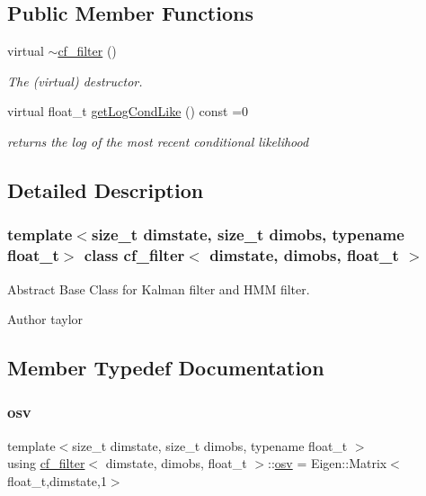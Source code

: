 \subsection*{Public Member Functions}
\begin{DoxyCompactItemize}
\item 
\mbox{\label{classcf__filter_afd3e7b3c1c0cc86257b406d494b0a7c9}} 
virtual \hyperlink{classcf__filter_afd3e7b3c1c0cc86257b406d494b0a7c9}{$\sim$cf\+\_\+filter} ()
\begin{DoxyCompactList}\small\item\em The (virtual) destructor. \end{DoxyCompactList}\item 
virtual float\+\_\+t \hyperlink{classcf__filter_a11b26307172bf94b8075ed2cdb8fc09c}{get\+Log\+Cond\+Like} () const =0
\begin{DoxyCompactList}\small\item\em returns the log of the most recent conditional likelihood \end{DoxyCompactList}\end{DoxyCompactItemize}


\subsection{Detailed Description}
\subsubsection*{template$<$size\+\_\+t dimstate, size\+\_\+t dimobs, typename float\+\_\+t$>$\newline
class cf\+\_\+filter$<$ dimstate, dimobs, float\+\_\+t $>$}

Abstract Base Class for Kalman filter and H\+MM filter. 

\begin{DoxyAuthor}{Author}
taylor 
\end{DoxyAuthor}


\subsection{Member Typedef Documentation}
\mbox{\label{classcf__filter_a91d9961b2ecd202b1400c401434b392d}} 
\subsubsection{\texorpdfstring{osv}{osv}}
{\footnotesize\ttfamily template$<$size\+\_\+t dimstate, size\+\_\+t dimobs, typename float\+\_\+t $>$ \\
using \hyperlink{classcf__filter}{cf\+\_\+filter}$<$ dimstate, dimobs, float\+\_\+t $>$\+::\hyperlink{classcf__filter_a91d9961b2ecd202b1400c401434b392d}{osv} =  Eigen\+::\+Matrix$<$float\+\_\+t,dimstate,1$>$}

